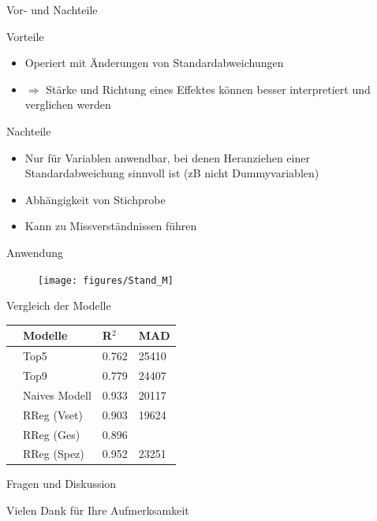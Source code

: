 \documentclass[10pt]{beamer}
\begin{document}
\begin{frame}{Vor- und Nachteile}
	
	\begin{Large}{Vorteile}\end{Large}
	
	\begin{itemize}
		\item Operiert mit Änderungen von Standardabweichungen
		\item $\Rightarrow$ Stärke und Richtung eines Effektes können besser interpretiert und verglichen werden
	\end{itemize}
	
	\begin{Large}{Nachteile}\end{Large}
	
	  \begin{itemize}
		\item Nur für Variablen anwendbar, bei denen Heranziehen einer Standardabweichung sinnvoll ist (zB nicht Dummyvariablen)
		\item Abhängigkeit von Stichprobe
		\item Kann zu Missverständnissen führen
	  \end{itemize}
	
\end{frame}

\begin{frame}{Anwendung}
	
	\begin{figure}
		\texttt{[image: figures/Stand\_M]}
	\end{figure}

\end{frame}	


\begin{frame}{Vergleich der Modelle}
\begin{table}[ht]
\centering
\begin{tabular}{rlll}
  \hline
 & Modelle & R$^2$ & MAD \\ 
  \hline
 & Top5 & 0.762 & 25410 \\ 
   & Top9 & 0.779 & 24407 \\ 
   & Naives Modell & 0.933 & 20117 \\ 
   & RReg (Vset) & 0.903 & 19624 \\ 
   & RReg (Ges) & 0.896 &  \\ 
   & RReg (Spez) & 0.952 & 23251 \\ 
   \hline
\end{tabular}
\end{table}

\end{frame}

\begin{frame}{Fragen und Diskussion}
	\begin{LARGE}
		\begin{center}
			Vielen Dank für Ihre Aufmerksamkeit
		\end{center}
	\end{LARGE}
\end{frame}
\end{document}
